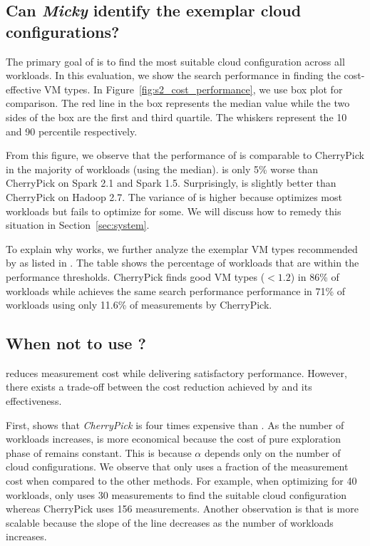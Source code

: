 \subsection{Can \emph{Micky} identify the exemplar cloud configurations?}

The primary goal of \micky is to find the most suitable cloud configuration across all workloads.
In this evaluation, we show the search performance in finding the cost-effective VM types.
In Figure~\ref{fig:s2_cost_performance}, we use box plot for comparison.
The red line in the box represents the median value while the two sides of the box are the first and third quartile.
The whiskers represent the 10 and 90 percentile respectively.

From this figure, we observe that the performance of \micky is comparable to CherryPick in the majority of workloads (using the median).
\micky is only 5\% worse than CherryPick on Spark 2.1 and Spark 1.5.
Surprisingly, \micky is slightly better than CherryPick on Hadoop 2.7.
The variance of \micky is higher because \micky
optimizes most workloads but fails to optimize for some.
We will discuss how to remedy this situation in Section~\ref{sec:system}.

To explain why \micky works, we further analyze the exemplar VM types recommended by \micky as listed in \mytable{\ref{table:top3}}.
The table shows the percentage of workloads that are within the performance thresholds.
CherryPick finds good VM types ($< 1.2$) in 86\% of workloads while
\micky achieves the same search performance performance in 71\% of workloads using only 11.6\% of measurements by CherryPick.




\subsection{When not to use \micky?}
\label{sec:kneepoint}

\micky reduces measurement cost while delivering satisfactory performance.
However, there exists a trade-off between the cost reduction achieved by \micky and its effectiveness.

First, \myfigure{\ref{fig:cost_saving}} shows that \emph{CherryPick} is four times expensive than \micky. As the number of workloads increases, \micky is more economical because
the cost of pure exploration phase of \micky remains constant. This is because $\alpha$ depends only on the number of cloud configurations.
We observe that \micky only uses a fraction of the measurement cost when compared to the other methods.
For example, when optimizing for 40 workloads, \micky only uses 30 measurements to find the suitable cloud configuration whereas CherryPick uses 156 measurements.
Another observation is that \micky is more scalable because the slope of the line decreases as the number of workloads increases.

